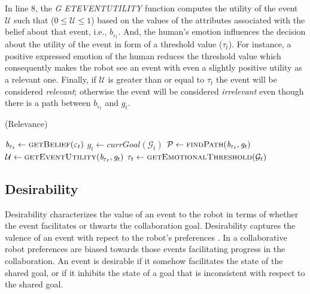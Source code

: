 \documentclass[letterpaper]{article}
\begin{document}
In line 8, the \textit{G{\fontsize{8}{8}\selectfont
ET}E{\fontsize{8}{8}\selectfont VENT}U{\fontsize{8}{8}\selectfont TILITY}}
function computes the utility of the event $\mathcal{U}$ such that ($0 \leq
\mathcal{U} \leq 1$) based on the values of the attributes associated with the
belief about that event, i.e., $\mathit{b}_{\varepsilon_t}$. And, the human's
emotion influences the decision about the utility of the event in form of a
threshold value ($\tau_{t}$). For instance, a positive expressed emotion of the
human reduces the threshold value which consequently makes the robot see an
event with even a slightly positive utility as a relevant one. Finally, if
$\mathcal{U}$ is greater than or equal to $\tau_{t}$ the event will be
considered \textit{relevant}; otherwise the event will be considered
\textit{irrelevant} even though there is a path between
$\mathit{b}_{\varepsilon_t}$ and $g_{t}$.

\begin{algorithm}
	\caption{(Relevance)}
	\label{alg:relevance}
	\begin{algorithmic}[1]
			\Statex
			\State $\mathit{b}_{\varepsilon_t} \gets \Call{getBelief}{\varepsilon_t}$
			\State $\mathit{g}_{t} \gets \textit{currGoal}{(\mathcal{G}_{t})}$
			\Statex
			\State $\mathcal{P} \gets \Call{findPath}{\mathit{b}_{\varepsilon_t},
			\mathit{g}_{t}}$
			\Statex
				\State {}
			\Else
				\State $\mathcal{U} \gets \Call{getEventUtility}{\mathit{b}_{\varepsilon_t},
				\mathit{g}_{t}}$ 
				\State $\tau_{t} \gets \Call{getEmotionalThreshold}{\mathcal{G}_{t}}$
				\State {}
				\Else
					\State {}
				\EndIf
			\EndIf
		\EndFunction
	\end{algorithmic}
\end{algorithm}

\subsection{Desirability}

Desirability characterizes the value of an event to the robot in terms of
whether the event facilitates or thwarts the collaboration goal. Desirability
captures the valence of an event with repect to the robot's preferences
\cite{gratch:domain-independent}. In a collaborative robot preferences are
biased towards those events facilitating progress in the collaboration. An event
is desirable if it somehow facilitates the state of the shared goal, or if it
inhibits the state of a goal that is inconsistent with respect to the shared
goal.
\end{document}
